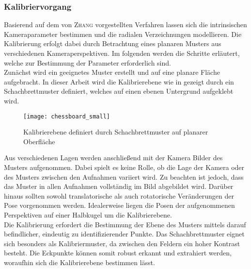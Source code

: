 \subsubsection{Kalibriervorgang}
Basierend auf dem von \textsc{Zhang} \cite{Zhang2000} vorgestellten Verfahren lassen sich die intrinsischen Kameraparameter bestimmen und die radialen Verzeichnungen modellieren. Die Kalibrierung erfolgt dabei durch Betrachtung eines planaren Musters aus verschiedenen Kameraperspektiven. Im folgenden werden die Schritte erläutert, welche zur Bestimmung der Parameter erforderlich sind.\\

Zunächst wird ein geeignetes Muster erstellt und auf eine planare Fläche aufgebracht. In dieser Arbeit wird die Kalibrierebene wie in  gezeigt durch ein Schachbrettmuster definiert, welches auf einen ebenen Untergrund aufgeklebt wird.

\begin{figure}[ht]
	\begin{center}
		\texttt{[image: chessboard\_small]}
		\caption{Kalibrierebene definiert durch Schachbrettmuster auf planarer Oberfläche}
		\label{fig.chesscalib}
	\end{center}
\end{figure}

Aus verschiedenen Lagen werden anschließend mit der Kamera Bilder des Musters aufgenommen. Dabei spielt es keine Rolle, ob die Lage der Kamera oder des Musters zwischen den Aufnahmen variiert wird. Zu beachten ist jedoch, dass das Muster in allen Aufnahmen vollständig im Bild abgebildet wird. Darüber hinaus sollten sowohl translatorische als auch rotatorische Veränderungen der Pose vorgenommen werden. Idealerweise liegen die Posen der aufgenommenen Perspektiven auf einer Halbkugel um die Kalibrierebene.\\

Die Kalibrierung erfordert die Bestimmung der Ebene des Musters mittels darauf befindlicher, eindeutig zu identifizierender Punkte. Das Schachbrettmuster eignet sich besonders als Kalibriermuster, da zwischen den Feldern ein hoher Kontrast besteht. Die Eckpunkte können somit robust erkannt und extrahiert werden, woraufhin sich die Kalibrierebene bestimmen lässt.\\

\prever{
}

